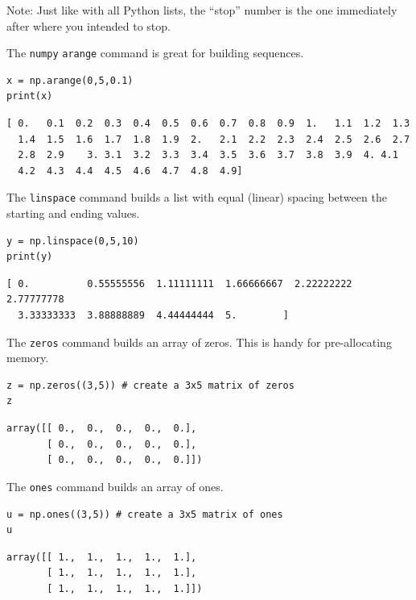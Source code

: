 Note: Just like with all Python lists, the ``stop'' number is the one immediately after where you intended to stop.

\begin{example}[Arange]
    The \texttt{numpy} \texttt{arange} command is great for building sequences.

\bcode
\begin{lstlisting}
x = np.arange(0,5,0.1)
print(x)
\end{lstlisting}
\boutput
\begin{lstlisting}
[ 0.   0.1  0.2  0.3  0.4  0.5  0.6  0.7  0.8  0.9  1.   1.1  1.2  1.3  
  1.4  1.5  1.6  1.7  1.8  1.9  2.   2.1  2.2  2.3  2.4  2.5  2.6  2.7  
  2.8  2.9    3. 3.1  3.2  3.3  3.4  3.5  3.6  3.7  3.8  3.9  4. 4.1  
  4.2  4.3  4.4  4.5  4.6  4.7  4.8  4.9]
\end{lstlisting}
    
\end{example}


\begin{example}[Linspace]
    The \texttt{linspace} command builds a list with equal (linear) spacing between the
    starting and ending values.

\bcode
\begin{lstlisting}
y = np.linspace(0,5,10)
print(y)
\end{lstlisting}
\boutput
\begin{lstlisting}
[ 0.          0.55555556  1.11111111  1.66666667  2.22222222  2.77777778
  3.33333333  3.88888889  4.44444444  5.        ]
\end{lstlisting}
\end{example}


\begin{example}[Zeros]
    The \texttt{zeros} command builds an array of zeros.  This is handy for pre-allocating
    memory.

\bcode
\begin{lstlisting}
z = np.zeros((3,5)) # create a 3x5 matrix of zeros
z
\end{lstlisting}
\boutput
\begin{lstlisting}
array([[ 0.,  0.,  0.,  0.,  0.],
       [ 0.,  0.,  0.,  0.,  0.],
       [ 0.,  0.,  0.,  0.,  0.]])
\end{lstlisting}
\end{example}


\begin{example}[Ones]
    The \texttt{ones} command builds an array of ones.

\bcode
\begin{lstlisting}
u = np.ones((3,5)) # create a 3x5 matrix of ones
u
\end{lstlisting}
\boutput
\begin{lstlisting}
array([[ 1.,  1.,  1.,  1.,  1.],
       [ 1.,  1.,  1.,  1.,  1.],
       [ 1.,  1.,  1.,  1.,  1.]])
\end{lstlisting}
\end{example}

